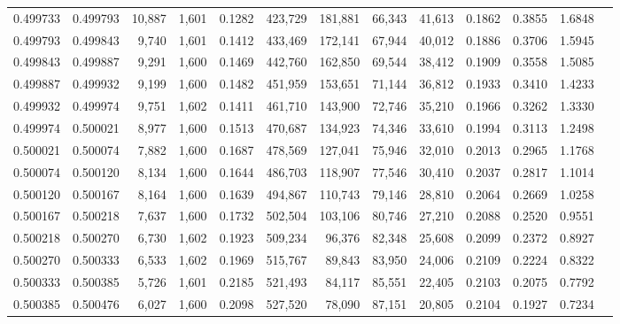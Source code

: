 \begin{tabular}{rrrrrrrrrrrrr}
0.499733 & 0.499793 & 10,887 & 1,601 &                                     0.1282 & 423,729 & 181,881 &  66,343 &  41,613 & 0.1862 & 0.3855 & 1.6848 \\
0.499793 & 0.499843 &  9,740 & 1,601 &                                     0.1412 & 433,469 & 172,141 &  67,944 &  40,012 & 0.1886 & 0.3706 & 1.5945 \\
0.499843 & 0.499887 &  9,291 & 1,600 &                                     0.1469 & 442,760 & 162,850 &  69,544 &  38,412 & 0.1909 & 0.3558 & 1.5085 \\
0.499887 & 0.499932 &  9,199 & 1,600 &                                     0.1482 & 451,959 & 153,651 &  71,144 &  36,812 & 0.1933 & 0.3410 & 1.4233 \\
0.499932 & 0.499974 &  9,751 & 1,602 &                                     0.1411 & 461,710 & 143,900 &  72,746 &  35,210 & 0.1966 & 0.3262 & 1.3330 \\
0.499974 & 0.500021 &  8,977 & 1,600 &                                     0.1513 & 470,687 & 134,923 &  74,346 &  33,610 & 0.1994 & 0.3113 & 1.2498 \\
0.500021 & 0.500074 &  7,882 & 1,600 &                                     0.1687 & 478,569 & 127,041 &  75,946 &  32,010 & 0.2013 & 0.2965 & 1.1768 \\
0.500074 & 0.500120 &  8,134 & 1,600 &                                     0.1644 & 486,703 & 118,907 &  77,546 &  30,410 & 0.2037 & 0.2817 & 1.1014 \\
0.500120 & 0.500167 &  8,164 & 1,600 &                                     0.1639 & 494,867 & 110,743 &  79,146 &  28,810 & 0.2064 & 0.2669 & 1.0258 \\
0.500167 & 0.500218 &  7,637 & 1,600 &                                     0.1732 & 502,504 & 103,106 &  80,746 &  27,210 & 0.2088 & 0.2520 & 0.9551 \\
0.500218 & 0.500270 &  6,730 & 1,602 &                                     0.1923 & 509,234 &  96,376 &  82,348 &  25,608 & 0.2099 & 0.2372 & 0.8927 \\
0.500270 & 0.500333 &  6,533 & 1,602 &                                     0.1969 & 515,767 &  89,843 &  83,950 &  24,006 & 0.2109 & 0.2224 & 0.8322 \\
0.500333 & 0.500385 &  5,726 & 1,601 &                                     0.2185 & 521,493 &  84,117 &  85,551 &  22,405 & 0.2103 & 0.2075 & 0.7792 \\
0.500385 & 0.500476 &  6,027 & 1,600 &                                     0.2098 & 527,520 &  78,090 &  87,151 &  20,805 & 0.2104 & 0.1927 & 0.7234 \\

\end{tabular}
